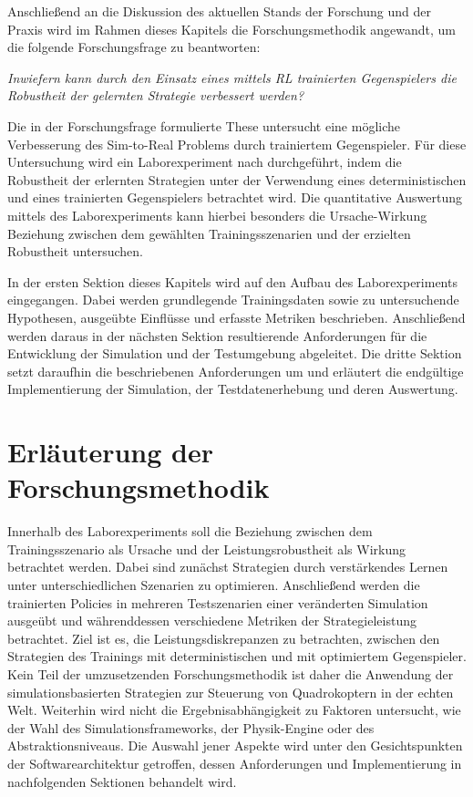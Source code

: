 Anschließend an die Diskussion des aktuellen Stands der Forschung und der Praxis wird im Rahmen dieses Kapitels die Forschungsmethodik angewandt, um die folgende Forschungsfrage zu beantworten:

\textit{Inwiefern kann durch den Einsatz eines mittels RL trainierten Gegenspielers die Robustheit der gelernten Strategie verbessert werden?}

Die in der Forschungsfrage formulierte These untersucht eine mögliche Verbesserung des Sim-to-Real Problems durch trainiertem Gegenspieler.
Für diese Untersuchung wird ein Laborexperiment nach \cite[]{Recker.2021} durchgeführt, indem die Robustheit der erlernten Strategien unter der Verwendung eines deterministischen und eines trainierten Gegenspielers betrachtet wird. 
Die quantitative Auswertung mittels des Laborexperiments kann hierbei besonders die Ursache-Wirkung Beziehung zwischen dem gewählten Trainingsszenarien und der erzielten Robustheit untersuchen.

In der ersten Sektion dieses Kapitels wird auf den Aufbau des Laborexperiments eingegangen.
Dabei werden grundlegende Trainingsdaten sowie zu untersuchende Hypothesen, ausgeübte Einflüsse und erfasste Metriken beschrieben.
Anschließend werden daraus in der nächsten Sektion resultierende Anforderungen für die Entwicklung der Simulation und der Testumgebung abgeleitet. 
Die dritte Sektion setzt daraufhin die beschriebenen Anforderungen um und erläutert die endgültige Implementierung der Simulation, der Testdatenerhebung und deren Auswertung.

\section{Erläuterung der Forschungsmethodik}

Innerhalb des Laborexperiments soll die Beziehung zwischen dem Trainingsszenario als Ursache und der Leistungsrobustheit als Wirkung betrachtet werden.
Dabei sind zunächst Strategien durch verstärkendes Lernen unter unterschiedlichen Szenarien zu optimieren. 
Anschließend werden die trainierten Policies in mehreren Testszenarien einer veränderten Simulation ausgeübt und währenddessen verschiedene Metriken der Strategieleistung betrachtet.
Ziel ist es, die Leistungsdiskrepanzen zu betrachten, zwischen den Strategien des Trainings mit deterministischen und mit optimiertem Gegenspieler.
Kein Teil der umzusetzenden Forschungsmethodik ist daher die Anwendung der simulationsbasierten Strategien zur Steuerung von Quadrokoptern in der echten Welt. 
Weiterhin wird nicht die Ergebnisabhängigkeit zu Faktoren untersucht, wie der Wahl des Simulationsframeworks, der Physik-Engine oder des Abstraktionsniveaus.
Die Auswahl jener Aspekte wird unter den Gesichtspunkten der Softwarearchitektur getroffen, dessen Anforderungen und Implementierung in nachfolgenden Sektionen behandelt wird.

